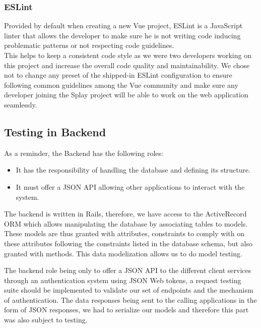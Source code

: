 \documentclass{eplmastersthesis}
\begin{document}
        \subsubsection{ESLint}

          Provided by default when creating a new Vue project, ESLint
          \cite{eslint} is a JavaScript linter that allows the developer to
          make sure he is not writing code inducing problematic patterns or not
          respecting code guidelines.\\
          This helps to keep a consistent code style as we were two developers working
          on this project and increase the overall code quality and
          maintainability. We chose not to change any preset of the shipped-in
          ESLint configuration to ensure following common guidelines among the Vue
          community and make sure any developer joining the Splay project will
          be able to work on the web application seamlessly.

      \subsection{Testing in Backend}

        As a reminder, the Backend has the following
        roles:

        \begin{itemize}
          \item It has the responsibility of handling the database and
          defining its structure.
          \item It must offer a JSON API allowing other applications to interact
          with the system.
        \end{itemize}

        The backend is written in Rails, therefore, we have access to the
        ActiveRecord ORM which allows manipulating the database by associating
        tables to models. These models are thus granted with attributes,
        constraints to comply with on these attributes following the constraints
        listed in the database schema, but also granted with methods. This data
        modelization allows us to do model testing.

        The backend role being only to offer a JSON API to the different client
        services through an authentication system using JSON Web tokens, a
        request testing suite should be implemented to validate our set of
        endpoints and the mechanism of authentication.
        The data responses being sent to the calling applications in the form
        of JSON responses, we had to serialize our models and therefore this
        part was also subject to testing.
\end{document}

